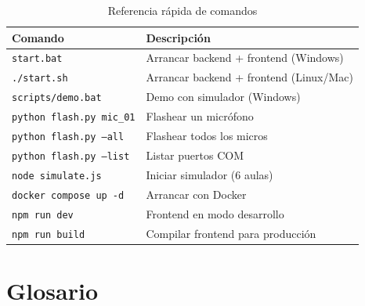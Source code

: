 \documentclass[12pt,a4paper]{report}
\begin{document}
\begin{table}[H]
\centering
\begin{tabularx}{\textwidth}{lX}
\toprule
\textbf{Comando} & \textbf{Descripci\'on} \\
\midrule
\texttt{start.bat} & Arrancar backend + frontend (Windows) \\
\texttt{./start.sh} & Arrancar backend + frontend (Linux/Mac) \\
\texttt{scripts/demo.bat} & Demo con simulador (Windows) \\
\texttt{python flash.py mic\_01} & Flashear un micr\'ofono \\
\texttt{python flash.py --all} & Flashear todos los micros \\
\texttt{python flash.py --list} & Listar puertos COM \\
\texttt{node simulate.js} & Iniciar simulador (6 aulas) \\
\texttt{docker compose up -d} & Arrancar con Docker \\
\texttt{npm run dev} & Frontend en modo desarrollo \\
\texttt{npm run build} & Compilar frontend para producci\'on \\
\bottomrule
\end{tabularx}
\caption{Referencia r\'apida de comandos}
\end{table}

\chapter{Glosario}
\end{document}

